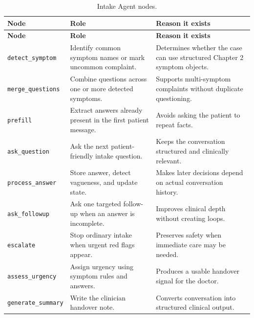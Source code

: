 \begin{longtable}{p{} p{} p{}}
\caption{Intake Agent nodes.}
\label{tab:intake_nodes}\\
\toprule
\textbf{Node} & \textbf{Role} & \textbf{Reason it exists}\\
\midrule
\endfirsthead
\toprule
\textbf{Node} & \textbf{Role} & \textbf{Reason it exists}\\
\midrule
\endhead
\texttt{detect\_symptom} & Identify common symptom names or mark uncommon complaint. & Determines whether the case can use structured Chapter 2 symptom objects.\\
\texttt{merge\_questions} & Combine questions across one or more detected symptoms. & Supports multi-symptom complaints without duplicate questioning.\\
\texttt{prefill} & Extract answers already present in the first patient message. & Avoids asking the patient to repeat facts.\\
\texttt{ask\_question} & Ask the next patient-friendly intake question. & Keeps the conversation structured and clinically relevant.\\
\texttt{process\_answer} & Store answer, detect vagueness, and update state. & Makes later decisions depend on actual conversation history.\\
\texttt{ask\_followup} & Ask one targeted follow-up when an answer is incomplete. & Improves clinical depth without creating loops.\\
\texttt{escalate} & Stop ordinary intake when urgent red flags appear. & Preserves safety when immediate care may be needed.\\
\texttt{assess\_urgency} & Assign urgency using symptom rules and answers. & Produces a usable handover signal for the doctor.\\
\texttt{generate\_summary} & Write the clinician handover note. & Converts conversation into structured clinical output.\\
\bottomrule
\end{longtable}

